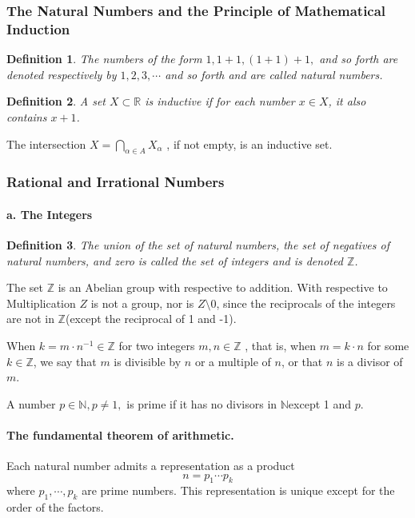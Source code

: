 \documentclass[a4paper,12pt]{article} %
\newtheorem{definition}{Definition}[section]
\begin{document}
\subsubsection{The Natural Numbers and the Principle of Mathematical 
Induction}
\begin{definition} 
    The numbers of the form $1,1+1,(1+1)+1,$ and so forth are denoted 
    respectively by $1,2,3,\cdots$ and so forth and are called natural
    numbers.
\end{definition}
\begin{definition}
    A set $X\subset\mathbb{R}$ is inductive if for each number $x\in X$, 
    it also contains $x+1$.
\end{definition}
The intersection $\displaystyle X=\bigcap_{\alpha \in A} X_{\alpha}$
, if not empty, is an inductive set. 

\subsubsection{Rational and Irrational Numbers}
\paragraph{a. The Integers}
\begin{definition}
    The union of the set of natural numbers, the set of negatives of 
    natural numbers, and zero is called the set of \textit{integers}
    and is denoted $\mathbb{Z}$.
\end{definition}

The set $\mathbb{Z}$  is an Abelian group with respective to addition.
With respective to Multiplication $Z$ is not a group, nor is $Z\setminus 0$, 
since the reciprocals of the integers are not in $\mathbb{Z} $(except 
the reciprocal of 1 and -1).

When $k=m\cdot n^{-1}\in\mathbb{Z}$ for two integers $m,n\in\mathbb{Z}$ ,
that is, when $m=k\cdot n$ for some $k\in \mathbb{Z} $, we say that 
$m$ is divisible by $n$ or a multiple of $n$, or that $n$ is a divisor 
of $m$.

A number $p\in \mathbb{N},p\ne 1,$ is prime if it has no divisors in 
$\mathbb{N} $except 1 and $p$.

\paragraph{The fundamental theorem of arithmetic.} Each natural number 
admits a representation as a product 
\[n=p_1\cdots p_k\]
where $p_1,\cdots,p_k$ are prime numbers. This representation is unique
except for the order of the factors.
\end{document}
